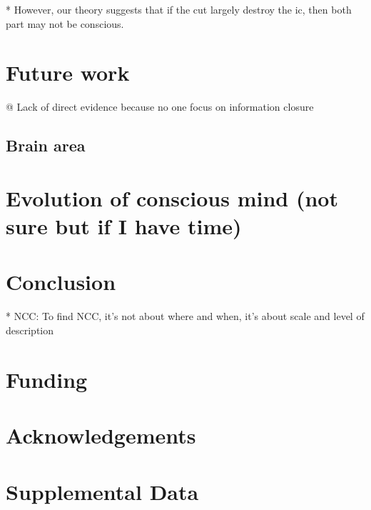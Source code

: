 \documentclass[utf8]{article}
\newenvironment{ants}
			{
			 \begin{easylist}[itemize]
			}
			{
			\end{easylist}
			}
\begin{document}
			* However, our theory suggests that if the cut largely destroy the \ac{ic}, then both part may not be conscious. 
		
	\section{Future work}
		\begin{ants}
			
			@ Lack of direct evidence because no one focus on information closure
			
		\end{ants}
	
	
	
		\subsection{Brain area}
	
	\section{Evolution of conscious mind (not sure but if I have time)}
		\cite{dennett2008kinds}

	\section{Conclusion}
		* NCC: To find NCC, it's not about where and when, it's about scale and level of description
	
	
	
	\section*{Funding}
	
	\section*{Acknowledgements}
	
	\section*{Supplemental Data}
	
	
	
	
	
	
\end{document}
